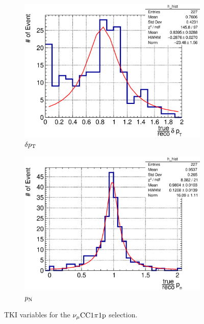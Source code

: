 \begin{figure}
          \\
          \begin{subfigure}[b]{\dbfigwid\textwidth}
               \centering
               \includegraphics[width=\textwidth]{figures/perf/tki/SFGpTPCmu_dpt_rat_hist_al14.eps}
               \caption{$\delta p_\textrm{T}$}
               \label{subfig:1pi-dpt}
          \end{subfigure}
          \begin{subfigure}[b]{\dbfigwid\textwidth}
               \centering
               \includegraphics[width=\textwidth]{figures/perf/tki/SFGpTPCmu_pn_rat_hist_al14.eps}
               \caption{$p_\textrm{N}$}
               \label{subfig:1pi-pn}
          \end{subfigure}
          \caption{TKI variables for the $\nu_{\mu}\textrm{CC}1\pi1\textrm{p}$ selection.}
          \label{fig:mc-tki-1pi}
     \end{figure}

